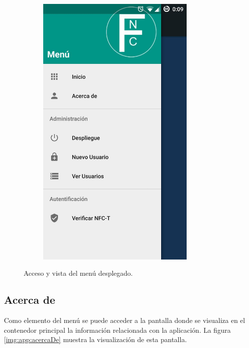 \documentclass[../PFC.tex]{subfiles}
\begin{document}
\begin{figure}[H]
\begin{subfigure}{0.4\textwidth}
       \includegraphics[width=0.85\textwidth]{./img/app/menuDesplegado}
    \end{subfigure}   
  \caption{Acceso y vista del menú desplegado.}
  \label{img:app:menuDesplegado}
\end{figure}

\subsection{Acerca de}
\label{App:AD:Acerca de}

Como elemento del menú se puede acceder a la pantalla donde se visualiza en el contenedor principal la información relacionada con la aplicación. La figura \ref{img:app:acercaDe} muestra la visualización de esta pantalla.
\end{document}
